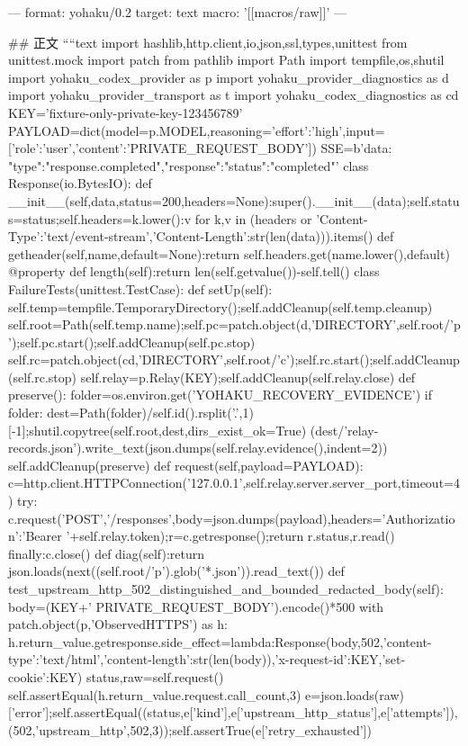 ---
format: yohaku/0.2
target: text
macro: '[[macros/raw]]'
---

## 正文
````text
import hashlib,http.client,io,json,ssl,types,unittest
from unittest.mock import patch
from pathlib import Path
import tempfile,os,shutil
import yohaku_codex_provider as p
import yohaku_provider_diagnostics as d
import yohaku_provider_transport as t
import yohaku_codex_diagnostics as cd
KEY='fixture-only-private-key-123456789'
PAYLOAD=dict(model=p.MODEL,reasoning={'effort':'high'},input=[{'role':'user','content':'PRIVATE_REQUEST_BODY'}])
SSE=b'data: {"type":"response.completed","response":{"status":"completed"}}\n\n'
class Response(io.BytesIO):
 def __init__(self,data,status=200,headers=None):super().__init__(data);self.status=status;self.headers={k.lower():v for k,v in (headers or {'Content-Type':'text/event-stream','Content-Length':str(len(data))}).items()}
 def getheader(self,name,default=None):return self.headers.get(name.lower(),default)
 @property
 def length(self):return len(self.getvalue())-self.tell()
class FailureTests(unittest.TestCase):
 def setUp(self):
  self.temp=tempfile.TemporaryDirectory();self.addCleanup(self.temp.cleanup)
  self.root=Path(self.temp.name);self.pc=patch.object(d,'DIRECTORY',self.root/'p');self.pc.start();self.addCleanup(self.pc.stop)
  self.rc=patch.object(cd,'DIRECTORY',self.root/'c');self.rc.start();self.addCleanup(self.rc.stop)
  self.relay=p.Relay(KEY);self.addCleanup(self.relay.close)
  def preserve():
   folder=os.environ.get('YOHAKU_RECOVERY_EVIDENCE')
   if folder:
    dest=Path(folder)/self.id().rsplit('.',1)[-1];shutil.copytree(self.root,dest,dirs_exist_ok=True)
    (dest/'relay-records.json').write_text(json.dumps(self.relay.evidence(),indent=2))
  self.addCleanup(preserve)
 def request(self,payload=PAYLOAD):
  c=http.client.HTTPConnection('127.0.0.1',self.relay.server.server_port,timeout=4)
  try:
   c.request('POST','/responses',body=json.dumps(payload),headers={'Authorization':'Bearer '+self.relay.token});r=c.getresponse();return r.status,r.read()
  finally:c.close()
 def diag(self):return json.loads(next((self.root/'p').glob('*.json')).read_text())
 def test_upstream_http_502_distinguished_and_bounded_redacted_body(self):
  body=(KEY+' PRIVATE_REQUEST_BODY').encode()*500
  with patch.object(p,'ObservedHTTPS') as h:
   h.return_value.getresponse.side_effect=lambda:Response(body,502,{'content-type':'text/html','content-length':str(len(body)),'x-request-id':KEY,'set-cookie':KEY})
   status,raw=self.request()
   self.assertEqual(h.return_value.request.call_count,3)
  e=json.loads(raw)['error'];self.assertEqual((status,e['kind'],e['upstream_http_status'],e['attempts']),(502,'upstream_http',502,3));self.assertTrue(e['retry_exhausted'])
